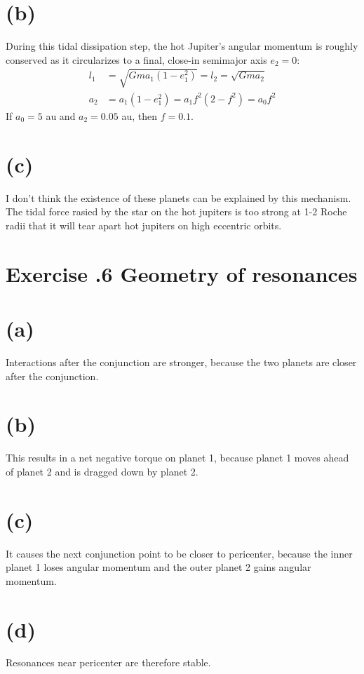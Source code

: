 \documentclass[a4paper,12pt]{article}
\begin{document}
\section*{(b)}
During this tidal dissipation step, the hot Jupiter's angular momentum is roughly conserved as it circularizes to a final, close-in
semimajor axis $e_2=0$:
\begin{align*}
    l_1 &= \sqrt{Gma_1(1-e_1^2)} = l_2 = \sqrt{Gma_2} \\
    a_2 &= a_1 (1-e_1^2) = a_1 f^2 (2 - f^2) = a_0 f^2
\end{align*}
If $a_0 = 5$ au and $a_2 = 0.05$ au, then $f = 0.1$.

\section*{(c)}
I don't think the existence of these planets can be explained by this mechanism.
The tidal force rasied by the star on the hot jupiters is too strong at 1-2 Roche radii that it will tear apart hot jupiters on high eccentric orbits.


\section*{\textbf{Exercise \uppercase\expandafter{}.6 Geometry of resonances}}
\section*{(a)} Interactions after the conjunction are stronger, because the two planets are closer after the conjunction.
\section*{(b)} This results in a net negative torque on planet 1, because planet 1 moves ahead of planet 2 and is dragged down by planet 2.
\section*{(c)} It causes the next conjunction point to be closer to pericenter, because the inner planet 1 loses angular momentum and the outer planet 2 gains angular momentum.
\section*{(d)} Resonances near pericenter are therefore stable.
\end{document}
